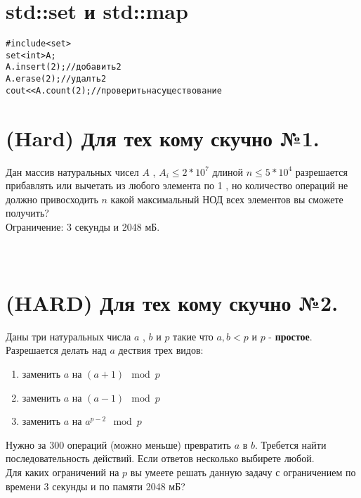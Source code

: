 \documentclass[10pt]{article}
\begin{document}
    \section{std::set и std::map}
        \begin{alltt}
#include<set>
set<int> A;
A.insert(2); // добавить 2
A.erase(2); // удалть 2
cout << A.count(2); // проверить на существование 
    \end{alltt}
    \section{(Hard) Для тех кому скучно №1.} 
    Дан массив натуральных чисел $A$ , $A_i \leq 2*10^7$  длиной $n \leq 5*10^4$ разрешается прибавлять или вычетать из любого элемента по 1 , но количество операций не должно привосходить $n$ какой максимальный НОД всех элементов вы сможете получить?
    \\
    Ограничение: 3 секунды и 2048 мБ.
    \\
    \\
    \\
    
    \section{(HARD) Для тех кому скучно №2.}
    Даны три натуральных числа $a$ , $b$ и $p$ такие что $a , b < p$ и $p$ -  \textbf{простое}.
    Разрешается делать над $a$ дествия трех видов:
    \begin{enumerate} 
        \item заменить $a$ на $(a + 1)\mod p$
        \item заменить $a$ на $(a - 1)\mod p$
        \item заменить $a$ на $a ^ {p -2}\mod p$
    \end{enumerate}
    Нужно за $300$ операций (можно меньше) превратить $a$ в $b$. Требется найти последовательность действий.
    Если ответов несколько выбирете любой.
    \\
    Для каких ограничений на $p$ вы умеете решать данную задачу с ограничением по времени 3 секунды и по памяти 2048 мБ?
    \\
    \\
    
    
\end{document}
